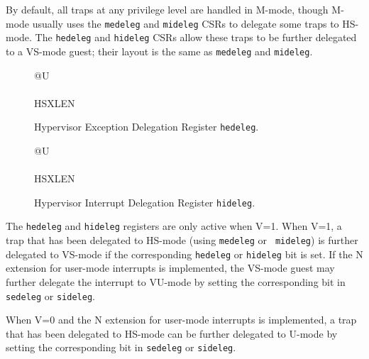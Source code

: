 By default, all traps at any privilege level are handled in M-mode, though
M-mode usually uses the {\tt medeleg} and {\tt mideleg} CSRs to delegate
some traps to HS-mode.  The {\tt hedeleg} and {\tt hideleg} CSRs allow these
traps to be further delegated to a VS-mode guest; their layout is the same
as {\tt medeleg} and {\tt mideleg}.

\begin{figure}[h!]
{\footnotesize
\begin{center}
\begin{tabular}{@{}U}
 \\
\hline
{} \\
\hline
HSXLEN \\
\end{tabular}
\end{center}
}
\vspace{-0.1in}
\caption{Hypervisor Exception Delegation Register {\tt hedeleg}.}
\label{hedelegreg}
\end{figure}

\begin{figure}[h!]
{\footnotesize
\begin{center}
\begin{tabular}{@{}U}
 \\
\hline
{} \\
\hline
HSXLEN \\
\end{tabular}
\end{center}
}
\vspace{-0.1in}
\caption{Hypervisor Interrupt Delegation Register {\tt hideleg}.}
\label{hidelegreg}
\end{figure}

The {\tt hedeleg} and {\tt hideleg} registers are only active when V=1.  When
V=1, a trap that has been delegated to HS-mode (using {\tt medeleg} or {\tt
mideleg}) is further delegated to VS-mode if the corresponding {\tt hedeleg} or
{\tt hideleg} bit is set.  If the N extension for user-mode interrupts
is implemented, the VS-mode guest may further delegate the interrupt
to VU-mode by setting the corresponding bit in {\tt sedeleg} or {\tt sideleg}.

When V=0 and the N extension for user-mode interrupts is implemented, a trap
that has been delegated to HS-mode can be further delegated to U-mode by
setting the corresponding bit in {\tt sedeleg} or {\tt sideleg}.

